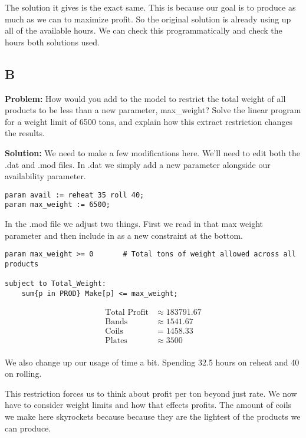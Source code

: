 The solution it gives is the exact same. This is because our goal is to produce as much as we can to maximize profit. So the original solution is already using up all of the available hours. We can check this programmatically and check the hours both solutions used. 

\subsection*{B}

\textbf{Problem:} How would you add to the model to restrict the total weight of all products to be less than a new parameter, max\_weight? Solve the linear program for a weight limit of 6500 tons, and explain how this extract restriction changes the results.

\noindent\textbf{Solution:} We need to make a few modifications here. We'll need to edit both the .dat and .mod files. In .dat we simply add a new parameter alongside our availability parameter.

\begin{lstlisting}
param avail := reheat 35 roll 40;
param max_weight := 6500; 
\end{lstlisting}

In the .mod file we adjust two things. First we read in that max weight parameter and then include in as a new constraint at the bottom.

\begin{lstlisting}
param max_weight >= 0		# Total tons of weight allowed across all products

subject to Total_Weight:
	sum{p in PROD} Make[p] <= max_weight;
\end{lstlisting}

\begin{align*}
	\text{Total Profit} &\approx 183791.67 \\
	\text{Bands} &\approx 1541.67 \\
	\text{Coils} &= 1458.33 \\
	\text{Plates} &\approx 3500 \\
\end{align*}

We also change up our usage of time a bit. Spending 32.5 hours on reheat and 40 on rolling. 

This restriction forces us to think about profit per ton beyond just rate. We now have to consider weight limits and how that effects profits. The amount of coils we make here skyrockets because because they are the lightest of the products we can produce.

